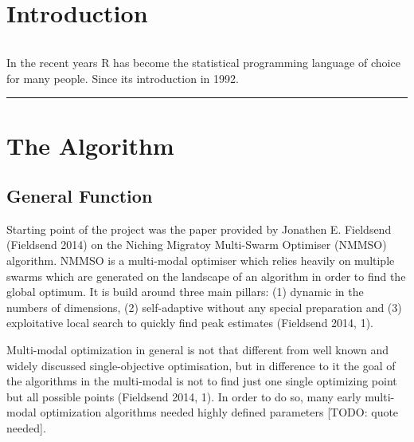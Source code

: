 \documentclass[12pt,a4paper]{article}
\begin{document}
\renewcommand\refname{References} %


\newpage
{} %
\tableofcontents
\newpage
\listoffigures

\newpage
{} %

\section{Introduction}\label{introduction}

\begin{verbatim}
\end{verbatim}

In the recent years R has become the statistical programming language of
choice for many people. Since its introduction in 1992.

\begin{center}\rule{0.5\linewidth}{\linethickness}\end{center}

\section{The Algorithm}\label{the-algorithm}

\subsection{General Function}\label{general-function}

Starting point of the project was the paper provided by Jonathen E.
Fieldsend (Fieldsend 2014) on the Niching Migratoy Multi-Swarm Optimiser
(NMMSO) algorithm. NMMSO is a multi-modal optimiser which relies heavily
on multiple swarms which are generated on the landscape of an algorithm
in order to find the global optimum. It is build around three main
pillars: (1) dynamic in the numbers of dimensions, (2) self-adaptive
without any special preparation and (3) exploitative local search to
quickly find peak estimates (Fieldsend 2014, 1).

Multi-modal optimization in general is not that different from well
known and widely discussed single-objective optimisation, but in
difference to it the goal of the algorithms in the multi-modal is not to
find just one single optimizing point but all possible points (Fieldsend
2014, 1). In order to do so, many early multi-modal optimization
algorithms needed highly defined parameters {[}TODO: quote needed{]}.
\end{document}
